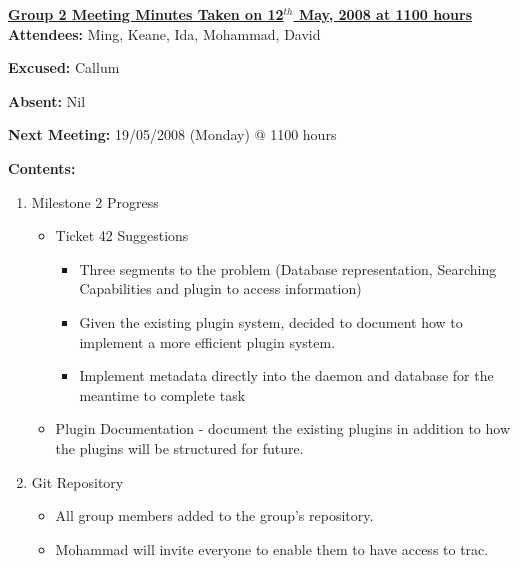 \documentclass{letter}
\begin{document}
{\large \textbf{\underline{Group 2 Meeting Minutes Taken on 12$^{th}$ May, 2008 at 1100 hours}}}\\

\textbf{Attendees:} Ming, Keane, Ida, Mohammad, David

\textbf{Excused:} Callum

\textbf{Absent:} Nil

\textbf{Next Meeting:} 19/05/2008 (Monday) @ 1100 hours

\textbf{Contents:}

\begin{enumerate}
\item Milestone 2 Progress 
	\begin{itemize}
	\item Ticket 42 Suggestions
		\begin{itemize}
			\item Three segments to the problem (Database representation, Searching Capabilities and plugin to access information)
			\item Given the existing plugin system, decided to document how to implement a more efficient plugin system.
			\item Implement metadata directly into the daemon and database for the meantime to complete task
		\end{itemize}
	\item Plugin Documentation - document the existing plugins in addition to how the plugins will be structured for future.
	\end{itemize}
\item Git Repository
	\begin{itemize}
	\item All group members added to the group's repository.
	\item Mohammad will invite everyone to enable them to have access to trac.
	\end{itemize}
\end{enumerate} 
\end{document}
